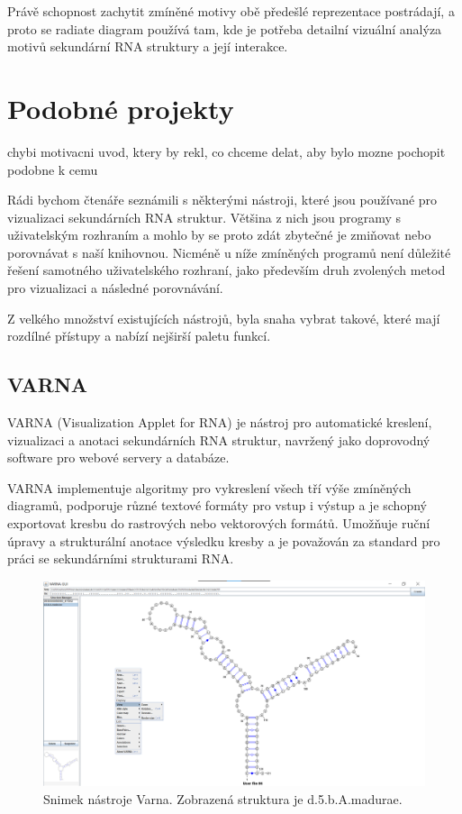 Právě schopnost zachytit zmíněné motivy obě předešlé reprezentace postrádají, a
proto se radiate diagram používá tam, kde je potřeba detailní vizuální analýza
motivů sekundární RNA struktury a její interakce. 


\section{Podobné projekty} {\color{red} chybi motivacni uvod, ktery by rekl, co chceme delat, aby bylo mozne pochopit podobne k cemu}

Rádi bychom čtenáře seznámili s některými nástroji, které jsou používané pro
vizualizaci sekundárních RNA struktur. Většina z nich jsou programy s
uživatelským rozhraním a mohlo by se proto zdát zbytečné je zmiňovat nebo
porovnávat s naší knihovnou. Nicméně u níže zmíněných programů není důležité
řešení samotného uživatelského rozhraní, jako především druh zvolených metod
pro vizualizaci a následné porovnávání.

Z velkého množství existujících nástrojů, byla snaha vybrat takové,
které mají rozdílné přístupy a nabízí nejširší paletu funkcí.

\subsection{VARNA} 

VARNA (Visualization Applet for RNA) je nástroj pro automatické
kreslení, vizualizaci a anotaci sekundárních RNA struktur, navržený jako
doprovodný software pro webové servery a databáze.

VARNA implementuje algoritmy pro vykreslení všech tří výše zmíněných diagramů,
podporuje různé textové formáty pro vstup i výstup a je schopný exportovat
kresbu do rastrových nebo vektorových formátů. Umožňuje ruční úpravy a
strukturální anotace výsledku kresby a je považován za standard pro práci se
sekundárními strukturami RNA.

\begin{figure}[H]
  \centering
  \includegraphics[width=140mm]{../img/kap01/tools/varna.png}
  \caption{Snimek nástroje Varna. Zobrazená struktura je d.5.b.A.madurae.}
\end{figure}

